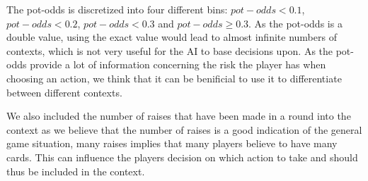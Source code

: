 The pot-odds is discretized into four different bins: $pot-odds < 0.1$, $pot-odds < 0.2 $, $pot-odds < 0.3$
and $ pot-odds \geq 0.3$. As the pot-odds is a double value, using the exact value would lead to almost infinite numbers of contexts, which
is not very useful for the AI to base decisions upon. As the pot-odds provide a lot of information concerning the risk
the player has when choosing an action, we think that it can be benificial to use it to differentiate between different
contexts.

We also included the number of raises that have been made in a round into the context as we believe that the number of
raises is a good indication of the general game situation, many raises implies that many players believe to have many
cards. This can influence the players decision on which action to take and should thus be included in the context.
